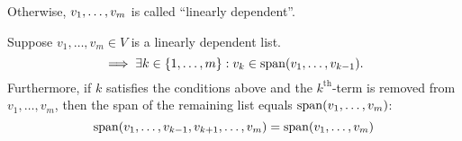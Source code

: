 \begin{mydef} 
  Otherwise, $v_1, \dots, v_m$ is called ``linearly dependent''.
\end{mydef}




\setcounter{thm}{18}
\begin{thm} 
  \label{thm: linear dependence lemma}
  Suppose $v_{1}, \dots, v_{m}\in V$ is a linearly dependent list.
  \begin{equation}
    \implies \exists k \in \{ 1, \dots, m \} : v_k \in \operatorname{span} (v_1, \dots, v_{k-1}).
  \end{equation}
  Furthermore, if $k$ satisfies the conditions above and the $k^{\text{th}}$-term is removed from $v_1, \dots, v_m$, then the span of the remaining list equals $\operatorname{span} (v_1, \dots, v_{m})$:
  \begin{equation}
    \operatorname{span} (v_1, \dots, v_{k-1}, v_{k+1}, \dots, v_m) = \operatorname{span} (v_1, \dots, v_m)
  \end{equation}
\end{thm}
